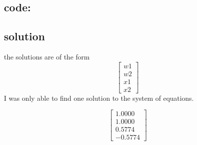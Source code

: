 \documentclass{article}
\begin{document}
\subsection*{code:}

\subsection*{solution}
the solutions are of the form $$\begin{bmatrix}
	w1\\
	w2\\
	x1\\
	x2
\end{bmatrix}$$
I was only able to find one solution to the system of equations.

$$\begin{bmatrix}
	1.0000 \\
	1.0000 \\
	0.5774 \\
	-0.5774 
\end{bmatrix}$$
\end{document}

